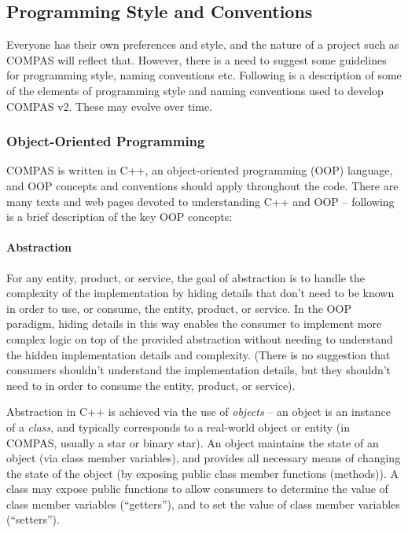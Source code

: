 \subsection{Programming Style and Conventions}\label{sec:ProgrammingStyleConventions}

Everyone has their own preferences and style, and the nature of a project such as COMPAS will reflect that. However, there is a need to suggest some guidelines for programming style, naming conventions etc. Following is a description of some of the elements of programming style and naming conventions used to develop COMPAS v2. These may evolve over time.

\subsubsection{Object-Oriented Programming}\label{sec:OOP}

COMPAS is written in C++, an object-oriented programming (OOP) language, and OOP concepts and conventions should apply throughout the code. There are many texts and web pages devoted to understanding C++ and OOP -- following is a brief description of the key OOP concepts:

\paragraph{Abstraction}\label{sec:Abstraction}\mbox{}

\medskip
For any entity, product, or service, the goal of abstraction is to handle the complexity of the implementation by hiding details that don't need to be known in order to use, or consume, the entity, product, or service. In the OOP paradigm, hiding details in this way enables the consumer to implement more complex logic on top of the provided abstraction without needing to understand the hidden implementation details and complexity. (There is no suggestion that consumers shouldn't understand the implementation details, but they shouldn't need to in order to consume the entity, product, or service).

Abstraction in C++ is achieved via the use of \textit{objects} -- an object is an instance of a \textit{class}, and typically corresponds to a real-world object or entity (in COMPAS, usually a star or binary star). An object maintains the state of an object (via class member variables), and provides all necessary means of changing the state of the object (by exposing public class member functions (methods)). A class may expose public functions to allow consumers to determine the value of class member variables (``getters''), and to set the value of class member variables (``setters'').  

